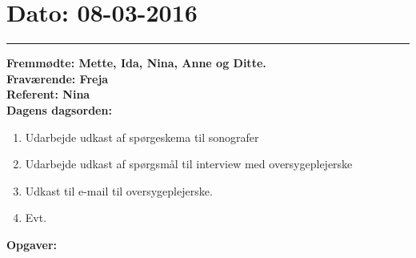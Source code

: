 \section{Dato: 08-03-2016}
\hrule
\textbf{Fremmødte: Mette, Ida, Nina, Anne og Ditte.} \\
\textbf{Fraværende: Freja} \\
\textbf{Referent: Nina } \\
\textbf{Dagens dagsorden: }
\begin{enumerate}
	\item Udarbejde udkast af spørgeskema til sonografer
	\item Udarbejde udkast af spørgsmål til interview med oversygeplejerske
	\item Udkast til e-mail til oversygeplejerske.
	\item Evt. 
\end{enumerate}

\textbf{Opgaver:} \newline

